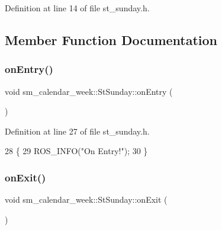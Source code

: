Definition at line 14 of file st\+\_\+sunday.\+h.



\subsection{Member Function Documentation}
\mbox{\label{structsm__calendar__week_1_1StSunday_a7b701f2b218ced9fe9b173d8cb3cdd0c}} 
\subsubsection{\texorpdfstring{on\+Entry()}{onEntry()}}
{\footnotesize\ttfamily void sm\+\_\+calendar\+\_\+week\+::\+St\+Sunday\+::on\+Entry (\begin{DoxyParamCaption}{ }\end{DoxyParamCaption})\hspace{0.3cm}{\ttfamily [inline]}}



Definition at line 27 of file st\+\_\+sunday.\+h.


\begin{DoxyCode}
28     \{
29         ROS\_INFO(\textcolor{stringliteral}{"On Entry!"});
30     \}
\end{DoxyCode}
\mbox{\label{structsm__calendar__week_1_1StSunday_aed3b7222b1138a60faeafc6a476d833a}} 
\subsubsection{\texorpdfstring{on\+Exit()}{onExit()}}
{\footnotesize\ttfamily void sm\+\_\+calendar\+\_\+week\+::\+St\+Sunday\+::on\+Exit (\begin{DoxyParamCaption}{ }\end{DoxyParamCaption})\hspace{0.3cm}{\ttfamily [inline]}}



